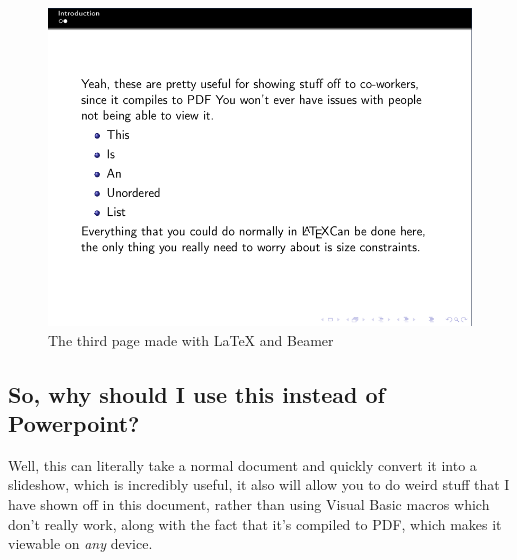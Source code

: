 \documentclass[12pt, letterpaper, oneside]{article} \usepackage[utf8]{inputenc}
\begin{document}
\begin{figure}[H]
	\includegraphics[width=\linewidth]{page3}
	\caption{The third page made with \LaTeX{} and Beamer}
\end{figure}


\subsection{So, why should I use this instead of Powerpoint?}

Well, this can literally take a normal document and quickly convert it into a slideshow, which is incredibly useful, it also will allow you to do weird stuff that I have shown off in this document, rather than using Visual Basic macros which don't really work, along with the fact that it's compiled to PDF, which makes it viewable on \emph{any} device.
\end{document}
